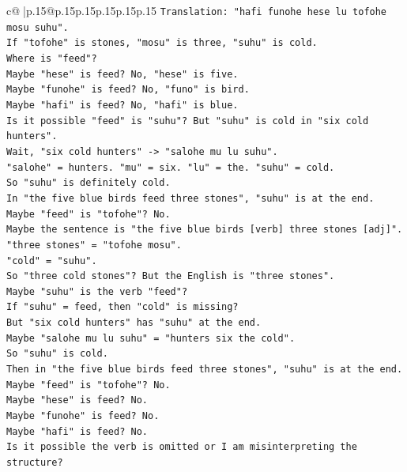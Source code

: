 \documentclass{article}
\begin{document}
{\begin{supertabular}{c@{$\;$}|p{.15\linewidth}@{}p{.15\linewidth}p{.15\linewidth}p{.15\linewidth}p{.15\linewidth}p{.15\linewidth}}
{{{\texttt{Translation: "hafi funohe hese lu tofohe mosu suhu".} \\
\texttt{If "tofohe" is stones, "mosu" is three, "suhu" is cold.} \\
\texttt{Where is "feed"?} \\
\texttt{Maybe "hese" is feed? No, "hese" is five.} \\
\texttt{Maybe "funohe" is feed? No, "funo" is bird.} \\
\texttt{Maybe "hafi" is feed? No, "hafi" is blue.} \\
\texttt{Is it possible "feed" is "suhu"? But "suhu" is cold in "six cold hunters".} \\
\texttt{Wait, "six cold hunters" {-}> "salohe mu lu suhu".} \\
\texttt{"salohe" = hunters. "mu" = six. "lu" = the. "suhu" = cold.} \\
\texttt{So "suhu" is definitely cold.} \\
\texttt{In "the five blue birds feed three stones", "suhu" is at the end.} \\
\texttt{Maybe "feed" is "tofohe"? No.} \\
\texttt{Maybe the sentence is "the five blue birds {[}verb{]} three stones {[}adj{]}".} \\
\texttt{"three stones" = "tofohe mosu".} \\
\texttt{"cold" = "suhu".} \\
\texttt{So "three cold stones"? But the English is "three stones".} \\
\texttt{Maybe "suhu" is the verb "feed"?} \\
\texttt{If "suhu" = feed, then "cold" is missing?} \\
\texttt{But "six cold hunters" has "suhu" at the end.} \\
\texttt{Maybe "salohe mu lu suhu" = "hunters six the cold".} \\
\texttt{So "suhu" is cold.} \\
\texttt{Then in "the five blue birds feed three stones", "suhu" is at the end.} \\
\texttt{Maybe "feed" is "tofohe"? No.} \\
\texttt{Maybe "hese" is feed? No.} \\
\texttt{Maybe "funohe" is feed? No.} \\
\texttt{Maybe "hafi" is feed? No.} \\
\texttt{Is it possible the verb is omitted or I am misinterpreting the structure?} \\
}}}
\end{supertabular}}
\end{document}

